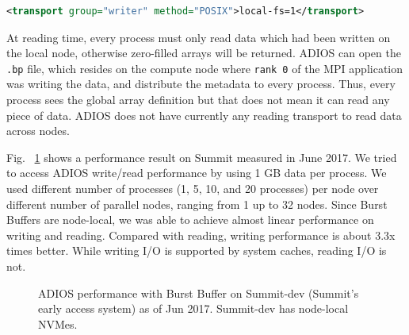 \begin{lstlisting}[language=XML]
<transport group="writer" method="POSIX">local-fs=1</transport>
\end{lstlisting}

At reading time, every process must only read data which had been written on the local node, otherwise zero-filled arrays will be returned. ADIOS can open the \verb+.bp+ file, which resides on the compute node where \verb+rank 0+ of the MPI application was writing the data, and distribute the metadata to every process. Thus, every process sees the global array definition but that does not mean it can read any piece of data. ADIOS does not have currently any reading transport to read data across nodes. 

Fig. ~\ref{fig:summit} shows a performance result on Summit measured in June 2017. We tried to access ADIOS write/read performance by using 1 GB data per process. We used different number of processes (1, 5, 10, and 20 processes) per node over different number of parallel nodes, ranging from 1 up to 32 nodes. Since Burst Buffers are node-local, we was able to achieve almost linear performance on writing and reading. Compared with reading, writing performance is about 3.3x times better. While writing I/O is supported by system caches, reading I/O is not. 

\begin{figure}[]
\center
{}
\caption{ADIOS performance with Burst Buffer on Summit-dev (Summit's early access system) as of Jun 2017. Summit-dev has node-local NVMes.}
\label{fig:summit}
\end{figure}

